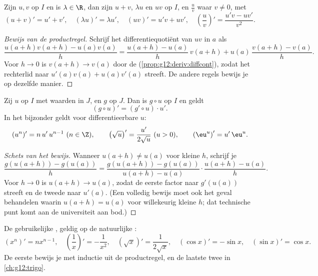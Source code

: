 \begin{proposition}[Bewerkingen]\label{prop:g12:deriv:operations}
Zijn $u, v$  op $I$ en is $\lambda \in \R$, dan zijn
$u + v$, $\lambda u$ en $uv$  op $I$, en $\frac{u}{v}$ waar
$v \neq 0$, met
\[
(u+v)' = u' + v', \quad (\lambda u)' = \lambda u', \quad
(uv)' = u'v + uv', \quad
\left(\frac{u}{v}\right)' = \frac{u'v - uv'}{v^2}.
\]
\end{proposition}

\begin{proof}[Bewijs van de productregel]
Schrijf het differentiequotiënt van $uv$ in $a$ als
\[
\frac{u(a+h)v(a+h) - u(a)v(a)}{h}
= \frac{u(a+h) - u(a)}{h}\,v(a+h) + u(a)\,\frac{v(a+h) - v(a)}{h}.
\]
Voor $h \to 0$ is $v(a+h) \to v(a)$ door de 
(\cref{prop:g12:deriv:diffcont}), zodat het rechterlid naar
$u'(a)v(a) + u(a)v'(a)$ streeft. De andere regels bewijs je op dezelfde
manier.
\end{proof}

\begin{theorem}[Kettingregel]\label{thm:g12:deriv:chain}
Zij $u$  op $I$ met waarden in $J$, en $g$
 op $J$. Dan is $g \circ u$  op $I$ en
geldt
\[
(g \circ u)' = (g' \circ u) \cdot u' .
\]
In het bijzonder geldt voor differentieerbare $u$:
\[
(u^n)' = n\,u'\,u^{n-1} \ (n \in \Z), \qquad
\left(\sqrt{u}\right)' = \frac{u'}{2\sqrt{u}} \ (u > 0), \qquad
\left(\eu^{u}\right)' = u'\,\eu^{u}.
\]
\end{theorem}

\begin{proof}[Schets van het bewijs]
Wanneer $u(a+h) \neq u(a)$ voor kleine $h$, schrijf je
\[
\frac{g(u(a+h)) - g(u(a))}{h}
= \frac{g(u(a+h)) - g(u(a))}{u(a+h) - u(a)} \cdot \frac{u(a+h) - u(a)}{h}.
\]
Voor $h \to 0$ is $u(a+h) \to u(a)$, zodat de eerste factor naar $g'(u(a))$
streeft en de tweede naar $u'(a)$. (Een volledig bewijs moet ook het geval
behandelen waarin $u(a+h) = u(a)$ voor willekeurig kleine $h$; dat technische
punt komt aan de universiteit aan bod.)
\end{proof}

\begin{example}
De gebruikelijke , geldig op de natuurlijke :
\[
(x^n)' = nx^{n-1}, \quad
\left(\frac{1}{x}\right)' = -\frac{1}{x^2}, \quad
(\sqrt{x})' = \frac{1}{2\sqrt{x}}, \quad
(\cos x)' = -\sin x, \quad
(\sin x)' = \cos x .
\]
De eerste bewijs je met inductie uit de productregel, en de laatste twee in
\cref{ch:g12:trigo}.
\end{example}

